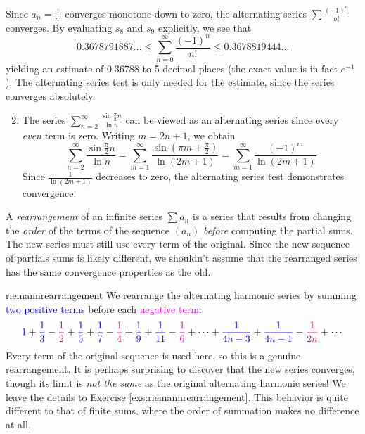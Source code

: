 \begin{examples}{}{}
	\exstart Since $a_n=\frac 1{n!}$ converges monotone-down to zero, the alternating series $\sum\frac{(-1)^n}{n!}$ converges. By evaluating $s_8$ and $s_9$ explicitly, we see that
	\[
		0.3678791887\ldots
		\le\sum_{n=0}^\infty\frac{(-1)^n}{n!}
		\le 0.3678819444\ldots
	\]
	yielding an estimate of $0.36788$ to 5 decimal places (the exact value is in fact $e^{-1}$). The alternating series test is only needed for the estimate, since the series converges absolutely.
	
	\begin{enumerate}\setcounter{enumi}{1}
	  \item The series $\sum_{n=2}^\infty\frac{\sin\frac\pi 2n}{\ln n}$ can be viewed as an alternating series since every \emph{even} term is zero. Writing $m=2n+1$, we obtain
	  \[
	  	\sum_{n=2}^\infty\frac{\sin\frac\pi 2n}{\ln n} 
	  	=\sum_{m=1}^\infty\frac{\sin(\pi m+\frac\pi 2)}{\ln(2m+1)}
	  	=\sum_{m=1}^\infty\frac{(-1)^{m}}{\ln(2m+1)} 
	  \]
	  Since $\frac 1{\ln(2m+1)}$ decreases to zero, the alternating series test demonstrates convergence.
	\end{enumerate}
\end{examples}

\smallskip


A \emph{rearrangement} of an infinite series $\sum a_n$ is a series that results from changing the \emph{order} of the terms of the sequence $(a_n)$ \emph{before} computing the partial sums. The new series must still use every term of the original. Since the new sequence of partials sums is likely different, we shouldn't assume that the rearranged series has the same convergence properties as the old.

\begin{example}{}{riemannrearrangement}
	We rearrange the alternating harmonic series by summing \textcolor{blue}{two positive terms} before each \textcolor{magenta}{negative term}:
	\[	
		\textcolor{blue}{1}+\textcolor{blue}{\frac 13} 
		-\textcolor{magenta}{\frac 12}
		+\textcolor{blue}{\frac 15} +\textcolor{blue}{\frac 17} 
		-\textcolor{magenta}{\frac 14}
		+\textcolor{blue}{\frac 19} +\textcolor{blue}{\frac 1{11}} 
		-\textcolor{magenta}{\frac 16}
		+\cdots 
		+\textcolor{blue}{\frac 1{4n-3}} +\textcolor{blue}{\frac 1{4n-1}} 
		-\textcolor{magenta}{\frac 1{2n}} 
		+\cdots
	\]
	Every term of the original sequence is used here, so this is a genuine rearrangement. It is perhaps surprising to discover that the new series converges, though its limit is \emph{not the same} as the original alternating harmonic series! We leave the details to Exercise \ref{exs:riemannrearrangement}. This behavior is quite different to that of finite sums, where the order of summation makes no difference at all. 
\end{example}

